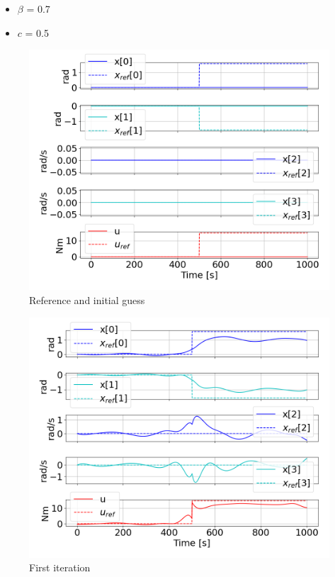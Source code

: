 \begin{itemize}
    \item $\beta$ = 0.7
    \item  $c$ = 0.5
\end{itemize}

\begin{figure}
    \centering
    \includegraphics[width=0.8\linewidth]{figs/downwards_0.png}
    \caption{Reference and initial guess}
    \label{fig:downward_0}
\end{figure}

\begin{figure}
    \centering
    \includegraphics[width=0.8\linewidth]{figs/downwards_1.png}
    \caption{First iteration}
    \label{fig:downwards_1}
\end{figure}


